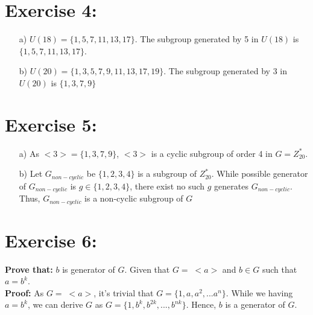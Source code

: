 \documentclass{article}
\begin{document}
	\section{Exercise 4:}
		\begin{enumerate}
			\item [a)] $U(18) = \{1, 5, 7, 11, 13, 17\}$. The subgroup generated by 5 in $U(18)$ is $\{1,5,7,11,13,17\}$.
			\item [b)] $U(20) = \{1,3,5,7,9,11,13,17,19\}$. The subgroup generated by 3 in $U(20)$ is $\{1,3,7,9\}$
		\end{enumerate}
	
	\section{Exercise 5:}
		\begin{enumerate}
			\item [a)]
				As $<3> = \{1,3,7,9\}$, $<3>$ is a cyclic subgroup of order 4 in $G = Z_{20}^*$.
			\item [b)]
				Let $G_{non-cyclic}$ be $\{1,2,3,4\}$ is a subgroup of $Z_{20}^*$. While possible generator of $G_{non-cyclic}$ is $g \in \{1,2,3,4\}$, there exist no such $g$ generates $G_{non-cyclic}$. Thus, $G_{non-cyclic}$ is a non-cyclic subgroup of $G$
		\end{enumerate}

	\section{Exercise 6:}
		\textbf{Prove that:} $b$ is generator of $G$. Given that $G= \; <a>$ and $b \in G$ such that $a = b^k$.\\
		\textbf{Proof:} As $G = \; <a>$, it's trivial that $G = \{1, a, a^2, ... a^n\}$. While we having $a = b^k$, we can derive $G$ as $G = \{1, b^k, b^{2k},..., b^{nk}\}$. Hence, $b$ is a generator of $G$.
\end{document}
